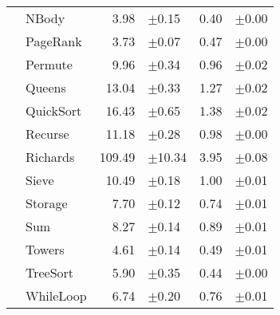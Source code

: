 \begin{tabular}{ll@{\hspace{6pt}}r@{\hspace{3pt}}l@{\hspace{6pt}}r@{\hspace{3pt}}l}
 & NBody & 3.98 & \scriptsize\textcolor{gray!60}{$\pm$0.15} & 0.40 & \scriptsize\textcolor{gray!60}{$\pm$0.00} \\
 & PageRank & 3.73 & \scriptsize\textcolor{gray!60}{$\pm$0.07} & 0.47 & \scriptsize\textcolor{gray!60}{$\pm$0.00} \\
 & Permute & 9.96 & \scriptsize\textcolor{gray!60}{$\pm$0.34} & 0.96 & \scriptsize\textcolor{gray!60}{$\pm$0.02} \\
 & Queens & 13.04 & \scriptsize\textcolor{gray!60}{$\pm$0.33} & 1.27 & \scriptsize\textcolor{gray!60}{$\pm$0.02} \\
 & QuickSort & 16.43 & \scriptsize\textcolor{gray!60}{$\pm$0.65} & 1.38 & \scriptsize\textcolor{gray!60}{$\pm$0.02} \\
 & Recurse & 11.18 & \scriptsize\textcolor{gray!60}{$\pm$0.28} & 0.98 & \scriptsize\textcolor{gray!60}{$\pm$0.00} \\
 & Richards & 109.49 & \scriptsize\textcolor{gray!60}{$\pm$10.34} & 3.95 & \scriptsize\textcolor{gray!60}{$\pm$0.08} \\
 & Sieve & 10.49 & \scriptsize\textcolor{gray!60}{$\pm$0.18} & 1.00 & \scriptsize\textcolor{gray!60}{$\pm$0.01} \\
 & Storage & 7.70 & \scriptsize\textcolor{gray!60}{$\pm$0.12} & 0.74 & \scriptsize\textcolor{gray!60}{$\pm$0.01} \\
 & Sum & 8.27 & \scriptsize\textcolor{gray!60}{$\pm$0.14} & 0.89 & \scriptsize\textcolor{gray!60}{$\pm$0.01} \\
 & Towers & 4.61 & \scriptsize\textcolor{gray!60}{$\pm$0.14} & 0.49 & \scriptsize\textcolor{gray!60}{$\pm$0.01} \\
 & TreeSort & 5.90 & \scriptsize\textcolor{gray!60}{$\pm$0.35} & 0.44 & \scriptsize\textcolor{gray!60}{$\pm$0.00} \\
 & WhileLoop & 6.74 & \scriptsize\textcolor{gray!60}{$\pm$0.20} & 0.76 & \scriptsize\textcolor{gray!60}{$\pm$0.01} \\
\bottomrule
\end{tabular}